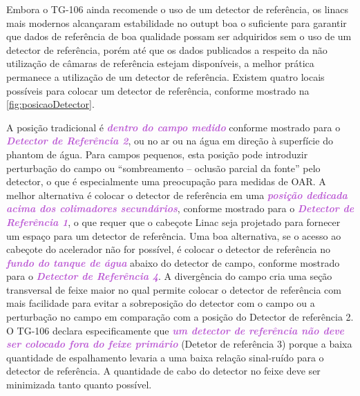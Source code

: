 \documentclass[11pt,a4paper]{article}
\begin{document}
	Embora o TG-106 ainda recomende o uso de um detector de referência, os linacs mais modernos alcançaram estabilidade no outupt boa o suficiente para garantir que  dados de referência de boa qualidade possam ser adquiridos sem o uso de um detector de referência, porém até que os dados publicados a respeito da não utilização de câmaras de referência estejam disponíveis, a melhor prática permanece a utilização de um detector de referência. Existem quatro locais possíveis para colocar um detector de referência, conforme mostrado na \ref{fig:posicaoDetector}.
	
	A posição tradicional é \textcolor{MediumOrchid}{\textbf{\textit{dentro do campo medido}}} conforme mostrado para o \textcolor{MediumOrchid}{\textbf{\textit{Detector de Referência 2}}}, ou no ar ou na água em direção à superfície do phantom de água. Para campos pequenos, esta posição pode introduzir perturbação do campo ou ``sombreamento -- oclusão parcial da fonte'' pelo detector, o que é especialmente uma preocupação para medidas de OAR. A melhor alternativa é colocar o detector de referência em uma \textcolor{MediumOrchid}{\textbf{\textit{posição dedicada acima dos colimadores secundários}}}, conforme mostrado para o \textcolor{MediumOrchid}{\textbf{\textit{Detector de Referência 1}}}, o que requer que o cabeçote Linac seja projetado para fornecer um espaço para um detector de referência. Uma boa alternativa, se o acesso ao cabeçote do acelerador não for possível, é colocar o detector de referência no \textcolor{MediumOrchid}{\textbf{\textit{fundo do tanque de água}}} abaixo do detector de campo, conforme mostrado para o \textcolor{MediumOrchid}{\textbf{\textit{Detector de Referência 4}}}. A divergência do campo cria uma seção transversal de feixe maior no qual permite colocar o detector de referência com mais facilidade para evitar a sobreposição do detector com o campo ou a perturbação no campo em comparação com a posição do Detector de referência 2. O TG-106 declara especificamente que \textcolor{MediumOrchid}{\textbf{\textit{um detector de referência não deve ser colocado fora do feixe primário}}} (Detetor de referência 3) porque a baixa quantidade de espalhamento levaria a uma baixa relação sinal-ruído para o detector de referência. A quantidade de cabo do detector no feixe deve ser minimizada tanto quanto possível.

	\
\end{document}
